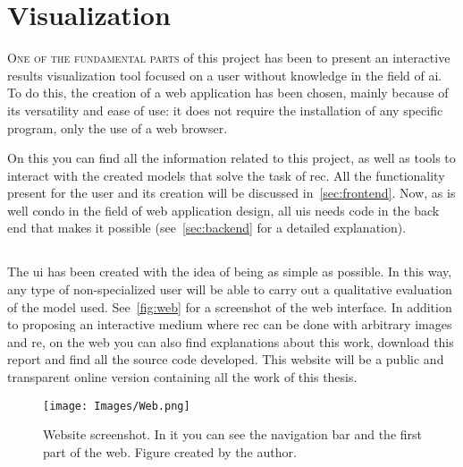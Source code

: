 

\chapter{Visualization}\label{cha:web}



\lettrine{O}{ne of the fundamental parts} of this project has been to present
an interactive results visualization tool focused on a user without knowledge
in the field of \gls{ai}. To do this, the creation of a web application has
been chosen, mainly because of its versatility and ease of use: it does not
require the installation of any specific program, only the use of a web
browser.

On this  you can find all the
information related to this project, as well as tools to interact with the
created models that solve the task of \gls{rec}. All the functionality present
for the user and its creation will be discussed in\ \vref{sec:frontend}. Now,
as is well condo in the field of web application design, all \glspl{ui} needs
code in the back end that makes it possible (see\ \vref{sec:backend} for a
detailed explanation).



\section{}%
\label{sec:frontend}

The \gls{ui} has been created with the idea of being as simple as possible. In
this way, any type of non-specialized user will be able to carry out a
qualitative evaluation of the model used. See\ \vref{fig:web} for a screenshot
of the web interface. In addition to proposing an interactive medium where
\gls{rec} can be done with arbitrary images and \gls{re}, on the web you can
also find explanations about this work, download this report and find all the
source code developed. This website will be a public and transparent online
version containing all the work of this thesis.

\begin{figure}[ht]
  \centering
  \texttt{[image: Images/Web.png]}
  \caption[Website screenshot]{Website screenshot. In it you can see the
    navigation bar and the first part of the web. Figure created by the
    author.}%
  \label{fig:web}
\end{figure}

